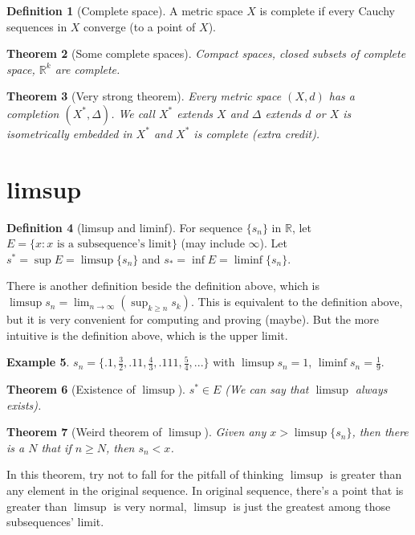 \documentclass[12pt]{article}
\newcommand{\RR}{\mathbb{R}}   %
\theoremstyle{definition}
\newtheorem{definition}{Definition}[section]
\newtheorem{example}[definition]{Example}
\theoremstyle{plain}
\newtheorem{theorem}[definition]{Theorem}
\begin{document}
\begin{definition}[Complete space]
A metric space $X$ is complete if every Cauchy sequences in $X$ converge (to a point of $X$).
\end{definition}

\begin{theorem}[Some complete spaces]
Compact spaces, closed subsets of complete space, $\RR^k$ are complete.
\end{theorem}

\begin{theorem}[Very strong theorem]
Every metric space $(X, d)$ has a completion $(X^*, \Delta)$. We call $X^*$ extends $X$ and $\Delta$ extends $d$ or $X$ is isometrically embedded in $X^*$ and $X^*$ is complete (extra credit).
\end{theorem}

\section{limsup}
\begin{definition}[limsup and liminf]
For sequence $\{s_n\}$ in $\RR$, let $E = \{x: x \text{ is a subsequence's limit}\}$ (may include $\infty$). Let $s^*= \sup E = \limsup \{s_n\}$ and $s_*= \inf E = \liminf \{s_n\}$.
\end{definition}

\begin{note}
There is another definition beside the definition above, which is $\limsup s_n = \lim_{n\rightarrow\infty}(\sup_{k\ge n}s_k)$. This is equivalent to the definition above, but it is very convenient for computing and proving (maybe). But the more intuitive is the definition above, which is the upper limit.
\end{note}

\begin{example}
$s_n =\{.1, \frac{3}{2}, .11, \frac{4}{3},.111,\frac{5}{4},...\}$ with $\limsup s_n = 1$, $\liminf s_n = \frac{1}{9}$.
\end{example}

\begin{theorem}[Existence of $\limsup$]
$s^* \in E$ (We can say that $\limsup$ always exists).
\end{theorem}

\begin{theorem}[Weird theorem of $\limsup$]
Given any $x > \limsup \{s_n\}$, then there is a $N$ that if $n \ge N$, then $s_n < x$.  
\end{theorem}

\begin{note}
In this theorem, try not to fall for the pitfall of thinking $\limsup$ is greater than any element in the original sequence. In original sequence, there's a point that is greater than $\limsup$ is very normal, $\limsup$ is just the greatest among those subsequences' limit.
\end{note}
\end{document}
